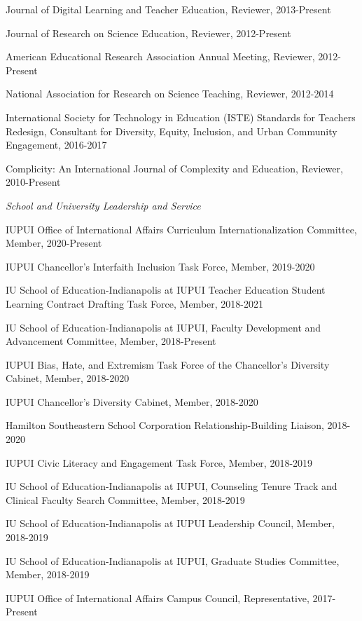 \documentclass[11pt,article,oneside]{memoir}
\begin{document}
\ind Journal of Digital Learning and Teacher Education, Reviewer, 2013-Present

\ind Journal of Research on Science Education, Reviewer, 2012-Present

\ind American Educational Research Association Annual Meeting, Reviewer, 2012-Present

\ind National Association for Research on Science Teaching, Reviewer, 2012-2014

\ind International Society for Technology in Education (ISTE) Standards for Teachers Redesign, Consultant for 
Diversity, Equity, Inclusion, and Urban Community Engagement, 2016-2017

\ind Complicity: An International Journal of Complexity and Education, Reviewer, 2010-Present


\medskip

\noindent\emph{School and University Leadership and Service \vspace{0.01in}}

\ind IUPUI Office of International Affairs Curriculum Internationalization Committee, Member, 2020-Present

\ind IUPUI Chancellor’s Interfaith Inclusion Task Force, Member, 2019-2020

\ind IU School of Education-Indianapolis at IUPUI Teacher Education Student Learning Contract Drafting Task Force, Member, 2018-2021

\ind IU School of Education-Indianapolis at IUPUI, Faculty Development and Advancement Committee, Member, 2018-Present

\ind IUPUI Bias, Hate, and Extremism Task Force of the Chancellor’s Diversity Cabinet, Member, 2018-2020

\ind IUPUI Chancellor’s Diversity Cabinet, Member, 2018-2020

\ind Hamilton Southeastern School Corporation Relationship-Building	Liaison, 2018-2020

\ind IUPUI Civic Literacy and Engagement Task Force, Member, 2018-2019

\ind IU School of Education-Indianapolis at IUPUI, Counseling Tenure Track and Clinical Faculty Search Committee, Member, 2018-2019

\ind IU School of Education-Indianapolis at IUPUI Leadership Council, Member, 2018-2019

\ind IU School of Education-Indianapolis at IUPUI, Graduate Studies Committee, Member, 2018-2019

\ind IUPUI Office of International Affairs Campus Council, Representative, 2017-Present
\end{document}
